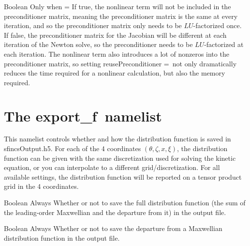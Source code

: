 \myhrule

{Boolean}
{\true}
{Only when  = \true}
{If true, the nonlinear term will not be included in the preconditioner matrix, meaning the preconditioner matrix is the same
at every iteration, and so the preconditioner matrix only needs to be $LU$-factorized once.  If false, the preconditioner matrix
for the Jacobian will be different at each iteration of the Newton solve, so the preconditioner needs to be $LU$-factorized at
each iteration.  The nonlinear term also introduces a lot of nonzeros into the preconditioner matrix, so setting
{\ttfamily reusePreconditioner =}\true~not only dramatically reduces the time required for a nonlinear calculation, but also the memory required.}










\section{The {\ttfamily export\_f}~namelist}

This namelist controls whether and how the distribution function is saved in {\ttfamily sfincsOutput.h5}.
For each of the 4 coordinates $(\theta, \zeta, x, \xi)$, the distribution function can be given with the same discretization
used for solving the kinetic equation, or you can interpolate to a different grid/discretization.
For all available settings, the distribution function will be reported on a tensor product grid in the 4 coordinates.

\myhrule

{Boolean}
{\false}
{Always}
{Whether or not to save the full distribution function (the sum of the leading-order Maxwellian and the departure from it)
in the output file.}

\myhrule

{Boolean}
{\false}
{Always}
{Whether or not to save the departure from a Maxwellian distribution function in the output file.}

\myhrule

